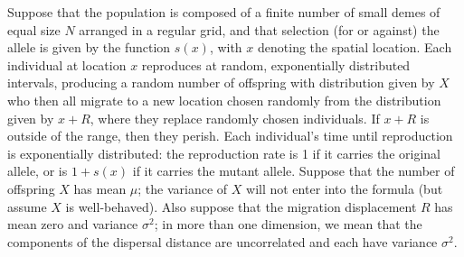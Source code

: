 \documentclass[10pt,letterpaper]{article}
\begin{document}
Suppose that the population is composed of a finite number of small demes of equal size $N$ arranged in a regular grid,
and that selection (for or against) the allele is given by the function $s(x)$, with $x$ denoting the spatial location.
Each individual at location $x$ reproduces at random, exponentially distributed intervals,
producing a random number of offspring with distribution given by $X$
who then all migrate to a new location chosen randomly from the distribution given by $x+R$,
where they replace randomly chosen individuals.
If $x+R$ is outside of the range, then they perish.
Each individual's time until reproduction is exponentially distributed:
the reproduction rate is 1 if it carries the original allele, or is $1+s(x)$ if it carries the mutant allele.
Suppose that the number of offspring $X$ has mean $\mu$; the variance of $X$ will not enter into the formula
(but assume $X$ is well-behaved).
Also suppose that the migration displacement $R$ has mean zero and variance $\sigma^2$;
in more than one dimension, we mean that the components of the dispersal distance are uncorrelated
and each have variance $\sigma^2$.
\end{document}
